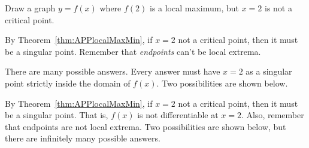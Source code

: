 \begin{question}
Draw a graph $y=f(x)$ where $f(2)$ is a local maximum, but $x=2$ is not a critical point.
\end{question}
\begin{hint}
By Theorem~\ref*{thm:APPlocalMaxMin},
if $x=2$ not a critical point, then it must be a singular point. Remember that \emph{endpoints} can't be local extrema.
\end{hint}
\begin{answer}
There are many possible answers. Every answer must have $x=2$ as a singular point strictly inside the domain of $f(x)$. Two possibilities are shown below.
\begin{center}
\hspace{2cm}
\end{center}
\end{answer}
\begin{solution}
By Theorem~\ref*{thm:APPlocalMaxMin}, if $x=2$ not a critical point, then it must be a singular point. That is, $f(x)$ is not differentiable at $x=2$. Also, remember that endpoints are not local extrema. Two possibilities are shown below, but there are infinitely many possible answers.
\begin{center}
\hspace{2cm}
\end{center}
\end{solution}




